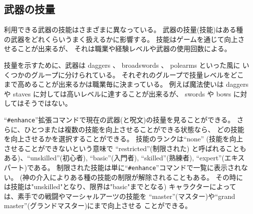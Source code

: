 \subsection*{武器の技量}

利用できる武器の技能はさまざまに異なっている。
武器の技量(技能)はある種の武器をどれくらいうまく扱えるかに影響する。
技能はゲームを通じて向上させることが出来るが、
それは職業や経験レベルや武器の使用回数による。

技量を示すために、武器は daggers 、 broadswords 、 polearms といった風に
いくつかのグループに分けられている。
それぞれのグループで技量レベルをどこまで高めることが出来るかは職業毎に決まっている。
例えば魔法使いは daggers や staves に対しては高いレベルに達することが出来るが、
swords や bows に対してはそうではない。

``{\tt \#enhance}''拡張コマンドで現在の武器(と呪文)の技量を見ることができる。
さらに、ひとつまたは複数の技能を向上させることができる状態なら、
どの技能を向上させるかを選択することができる。
技能のランクは``none'' (技能を向上させることができないという意味で
``restricted''(制限された) と呼ばれることもある)、``unskilled''(初心者),
``basic''(入門者), ``skilled''(熟練者), ``expert''(エキスパート)である。
制限された技能は単に``{\tt \#enhance}''コマンドで一覧に表示されない。
(神の介入によりある種の技能の制限が解除されることもある。
その時には技能は"unskilled"となり、限界は"basic"までとなる)
キャラクターによっては、素手での戦闘やマーシャルアーツの技能を
``master''(マスター)や``grand master''(グランドマスター)にまで向上させる
ことができる。

